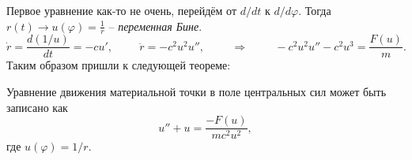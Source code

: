 Первое уравнение как-то не очень, перейдём от $d/dt$ к $d/d\varphi$. Тогда $r(t) \to u(\varphi) = \frac{1}{r}$ -- \textit{переменная Бине}.
$$
    \dot{r} = \frac{d(1/u)}{dt} = - c u', 
    \hspace{1cm} 
    \ddot{r} = - c^2 u^2 u'',
    \hspace{1cm} \Rightarrow \hspace{1cm} 
    -c^2 u^2 u'' - c^2 u^3 = \frac{F(u)}{m}.
$$
Таким образом пришли к следующей теореме:

\begin{to_thr}
    Уравнение движения материальной точки в поле центральных сил может быть записано как     
    \begin{equation}
    u'' + u = \frac{-F(u)}{m c^2 u^2},
\end{equation}
    где $u(\varphi) = 1/r$.
\end{to_thr}